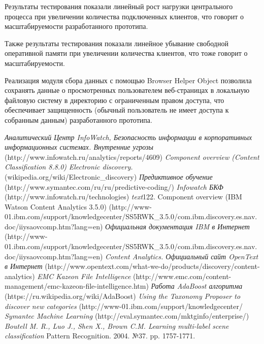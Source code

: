 \documentclass[russian, utf8, emptystyle]{eskdtext}
\begin{document}
Результаты тестирования показали линейный рост нагрузки центрального процесса при увеличении количества подключенных клиентов, что говорит о масштабируемости разработанного прототипа.

Также результаты тестирования показали линейное убывание свободной оперативной памяти при увеличении количества клиентов, что тоже говорит о масштабируемости.

Реализация модуля сбора данных с помощью Browser Helper Object позволила сохранять данные о просмотренных пользователем веб-страницах в локальную файловую систему в директорию с ограниченным правом доступа, что обеспечивает защищенность (обычный пользователь не имеет доступа к собранным данным) разработанного прототипа.
\begin{thebibliography}{50}
	\textit {Аналитический Центр InfoWatch, Безопасность информации в корпоративных информационных системах. Внутренние угрозы}
	{(http://www.infowatch.ru/analytics/reports/4609)}
	\textit {Component overview (Content Classification 8.8.0)}
	\textit{Electronic discovery.}
	{(wikipedia.org/wiki/Electronic\_discovery)}
	\textit {Предиктивное обучение}
	{(http://www.symantec.com/ru/ru/predictive-coding/)}
	\textit {Infowatch БКФ }
	{(http://www.infowatch.ru/technologies)}
	\textit{text}{122.	Component overview (IBM Watson Content Analytics 3.5.0)}
	{(http://www-01.ibm.com/support/knowledgecenter/SS5RWK\_3.5.0/com.ibm.discovery.es.nav.doc/iiysaovcomp.htm?lang=en)}
	\textit{Официальная документация IBM в Интернет}
	{(http://www-01.ibm.com/support/knowledgecenter/SS5RWK\_3.5.0/com.ibm.discovery.es.nav.doc/iiysaovcomp.htm?lang=en)}
	\textit{Content Analytics. Официальный сайт OpenText в Интернет}
	{(http://www.opentext.com/what-we-do/products/discovery/content-analytics)}
	\textit{EMC Kazeon File Intelligence}
	{(http://www.emc.com/content-management/emc-kazeon-file-intelligence.htm)}
	\textit{Работа AdaBoost алгоритма}
	{(https://ru.wikipedia.org/wiki/AdaBoost)}
	\textit{Using the Taxonomy Proposer to discover new categories}
	{(http://www-01.ibm.com/support/knowledgecenter/}
	\textit {Symantec Machine Learning}
	{(http://eval.symantec.com/mktginfo/enterprise/)}
	\textit{Boutell M. R., Luo J., Shen X., Brown C.M. Learning multi-label scene classification }
	{Pattern Recognition. 2004. №37. pp. 1757-1771.}

\end{thebibliography}
\end{document}
